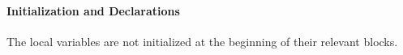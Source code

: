 \paragraph{Initialization and Declarations}
\begin{itemize}
		\begin{itemize}
				The local variables are not initialized at the beginning of their relevant blocks.
		\end{itemize}
\end{itemize}
%
%
%
%
